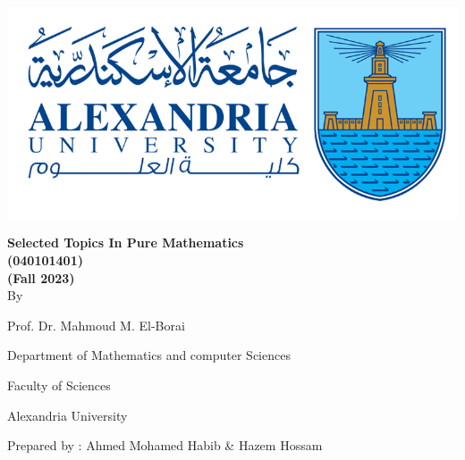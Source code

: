 \begingroup
{}
\begin{center}
    \includegraphics[scale=.5]{collage logo.png}
    \vspace*{1.5cm}
    \par
    {\fontsize{20pt}{30pt}\selectfont
        \textbf{Selected Topics In Pure Mathematics\\(040101401)\\(Fall 2023)}
        \\
        \vspace*{.75cm}
        By
        \vspace*{.75cm}

        Prof. Dr. Mahmoud M. El-Borai

        Department of Mathematics and computer Sciences

        Faculty of Sciences

        Alexandria University
    }

    \vspace*{\fill}
    {\fontsize{10pt}{10pt}\selectfont
    Prepared by : Ahmed Mohamed Habib \& Hazem Hossam
    }
\end{center}
\restoregeometry
\endgroup
\newpage
\tableofcontents
\thispagestyle{empty}
\newpage
\setcounter{page}{1}